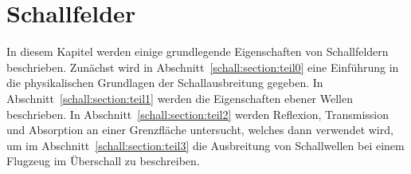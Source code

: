 %
%
%
%
\chapter{Schallfelder\label{chapter:schall}}
\begin{refsection}

\begin{comment}
Ein paar Hinweise für die korrekte Formatierung des Textes
\begin{itemize}
\item
Absätze werden gebildet, indem man eine Leerzeile einfügt.
Die Verwendung von \verb+\\+ ist nur in Tabellen und Arrays gestattet.
\item
Die explizite Platzierung von Bildern ist nicht erlaubt, entsprechende
Optionen werden gelöscht. 
Verwenden Sie Labels und Verweise, um auf Bilder hinzuweisen.
\item
Beginnen Sie jeden Satz auf einer neuen Zeile. 
Damit ermöglichen Sie dem Versionsverwaltungssysteme, Änderungen
in verschiedenen Sätzen von verschiedenen Autoren ohne Konflikt 
anzuwenden.
\item 
Bilden Sie auch für Formeln kurze Zeilen, einerseits der besseren
Übersicht wegen, aber auch um GIT die Arbeit zu erleichtern.
\end{itemize}

\end{comment}

In diesem Kapitel werden einige grundlegende Eigenschaften von
Schallfeldern beschrieben.
Zunächst wird in Abschnitt~\ref{schall:section:teil0} eine Einführung
in die physikalischen Grundlagen der Schallausbreitung gegeben.
In Abschnitt~\ref{schall:section:teil1} werden die Eigenschaften
ebener Wellen beschrieben.
In Abschnitt~\ref{schall:section:teil2} werden Reflexion, Transmission
und Absorption an einer Grenzfläche untersucht, welches dann verwendet
wird, um im Abschnitt~\ref{schall:section:teil3} die Ausbreitung
von Schallwellen bei einem Flugzeug im Überschall zu beschreiben.






\printbibliography[heading=subbibliography]
\end{refsection}
